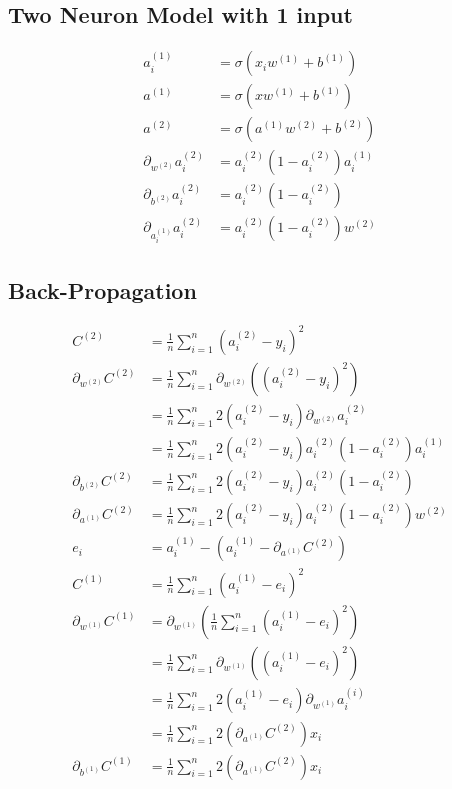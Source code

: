 \documentclass{article}
\begin{document}
\subsection{Two Neuron Model with 1 input}

\begin{align}
  a_i^{(1)} &= \sigma(x_i w^{(1)} + b^{(1)}) \\  
  a^{(1)} &= \sigma(xw^{(1)} + b^{(1)}) \\
  a^{(2)} &= \sigma(a^{(1)}w^{(2)} + b^{(2)}) \\
  \partial_{w^{(2)}}a_i^{(2)} &= a_i^{(2)}(1-a_i^{(2)})a_i^{(1)} \\  
  \partial_{b^{(2)}}a_i^{(2)} &= a_i^{(2)}(1-a_i^{(2)}) \\
  \partial_{a_i^{(1)}}a_i^{(2)} &= a_i^{(2)}(1-a_i^{(2)})w^{(2)}
\end{align}

\subsection{Back-Propagation}
\begin{align}
  C^{(2)} &= \frac{1}{n}\sum_{i=1}^{n}(a_i^{(2)} - y_i)^2 \\
  \partial_{w^{(2)}}C^{(2)} &= \frac{1}{n}\sum_{i=1}^{n} \partial_{w^{(2)}} ((a_i^{(2)} - y_i)^2) \\
            &= \frac{1}{n}\sum_{i=1}^{n}2(a_i^{(2)}-y_i)\partial_{w^{(2)}}a_i^{(2)} \\
            &= \frac{1}{n}\sum_{i=1}^{n}2(a_i^{(2)}-y_i)a_i^{(2)}(1-a_i^{(2)})a_i^{(1)} \\
  \partial_{b^{(2)}}C^{(2)} &= \frac{1}{n}\sum_{i=1}^{n}2(a_i^{(2)}-y_i)a_i^{(2)}(1-a_i^{(2)}) \\
  \partial_{a^{(1)}}C^{(2)} &= \frac{1}{n}\sum_{i=1}^{n}2(a_i^{(2)}-y_i)a_i^{(2)}(1-a_i^{(2)})w^{(2)} \\
  e_i &= a_i^{(1)} - (a_i^{(1)} - \partial_{a^{(1)}}C^{(2)}) \\
  C^{(1)} &= \frac{1}{n}\sum_{i=1}^{n}(a_i^{(1)} - e_i)^2 \\
  \partial_{w^{(1)}}C^{(1)} &= \partial_{w^{(1)}}\left(\frac{1}{n}\sum_{i=1}^{n}  (a_i^{(1)} - e_i)^2\right) \\
          &= \frac{1}{n}\sum_{i=1}^{n} \partial_{w^{(1)}}\left((a_i^{(1)} - e_i)^2\right) \\
            &= \frac{1}{n}\sum_{i=1}^{n} 2(a_i^{(1)} - e_i) \partial_{w^{(1)}}a_i^{(i)}\\
            &= \frac{1}{n}\sum_{i=1}^{n} 2(\partial_{a^{(1)}}C^{(2)})x_i \\  
  \partial_{b^{(1)}}C^{(1)} &= \frac{1}{n}\sum_{i=1}^{n} 2(\partial_{a^{(1)}}C^{(2)})x_i
\end{align}
\end{document}
